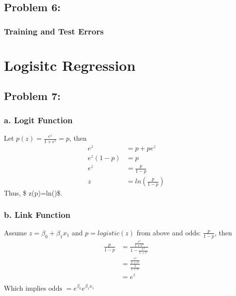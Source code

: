 \documentclass[]{article}
\begin{document}
\hypertarget{problem-6}{%
\subsection{Problem 6:}\label{problem-6}}

\hypertarget{training-and-test-errors}{%
\subsubsection{Training and Test
Errors}\label{training-and-test-errors}}

\hypertarget{logisitc-regression}{%
\section{Logisitc Regression}\label{logisitc-regression}}

\hypertarget{problem-7}{%
\subsection{Problem 7:}\label{problem-7}}

\hypertarget{a.-logit-function}{%
\subsubsection{a. Logit Function}\label{a.-logit-function}}

Let \(p(z)=\frac{e^z}{1+e^z}=p\), then \[
\begin{aligned}
    e^z&=p+pe^z\\
    e^z(1-p)&=p\\
    e^z&=\frac{p}{1-p}\\
    z&=ln(\frac{p}{1-p})
\end{aligned}
\] Thus, \$ z(p)=ln()\$.

\hypertarget{b.-link-function}{%
\subsubsection{b. Link Function}\label{b.-link-function}}

Assume \(z = \beta_0 + \beta_1 x_1\) and \(p = logistic(z)\) from above
and \(\text{odds: } \frac{p}{1-p}\), then \[
\begin{aligned}
    \frac{p}{1-p}&=\frac{\frac{e^z}{1+e^z}}{1-\frac{e^z}{1+e^z}}\\
    &=\frac{\frac{e^z}{1+e^z}}{\frac{1}{1+e^z}}\\
    &=e^z\\
\end{aligned}
\] Which implies \(\text{odds } = e^{\beta_0} e^{\beta_1 x_1}\)
\end{document}
